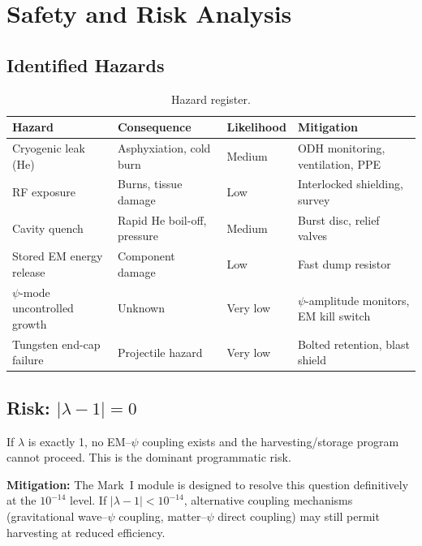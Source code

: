 \documentclass[11pt,a4paper]{article}
\begin{document}
\section{Safety and Risk Analysis}

\subsection{Identified Hazards}

\begin{table}[h]
\centering
\caption{Hazard register.}
\label{tab:hazards}
\begin{tabular}{@{}p{3cm}p{3cm}p{3cm}p{3cm}@{}}
\toprule
Hazard & Consequence & Likelihood & Mitigation \\
\midrule
Cryogenic leak (He) & Asphyxiation, cold burn & Medium & ODH monitoring, ventilation, PPE \\
RF exposure & Burns, tissue damage & Low & Interlocked shielding, survey \\
Cavity quench & Rapid He boil-off, pressure & Medium & Burst disc, relief valves \\
Stored EM energy release & Component damage & Low & Fast dump resistor \\
$\psi$-mode uncontrolled growth & Unknown & Very low & $\psi$-amplitude monitors, EM kill switch \\
Tungsten end-cap failure & Projectile hazard & Very low & Bolted retention, blast shield \\
\bottomrule
\end{tabular}
\end{table}

\subsection{Risk: $|\lambda-1| = 0$}

If $\lambda$ is exactly 1, no EM--$\psi$ coupling exists and the
harvesting/storage program cannot proceed.  This is the dominant
programmatic risk.

\textbf{Mitigation:} The Mark~I module is designed to resolve this
question definitively at the $10^{-14}$ level.  If $|\lambda-1| < 10^{-14}$,
alternative coupling mechanisms (gravitational wave--$\psi$ coupling,
matter--$\psi$ direct coupling) may still permit harvesting at reduced
efficiency.
\end{document}
